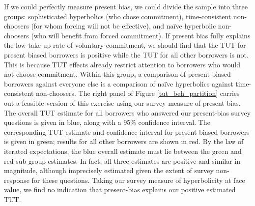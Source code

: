 \documentclass[oneside,11pt]{article}
\begin{document}
If we could perfectly measure present bias, we could divide the sample into three groups: sophisticated hyperbolics (who chose commitment), time-consistent non-choosers (for whom forcing will not be effective), and na\"{i}ve hyperbolic non-choosers (who will benefit from forced commitment). If present bias fully explains the low take-up rate of voluntary commitment, we should find that the TUT for present biased borrowers is positive while the TUT for all other borrowers is not.
This is because TUT effects already restrict attention to borrowers who would not choose commitment.
Within this group, a comparison of present-biased borrowers against everyone else is a comparison of na\"{i}ve hyperbolics against time-consistent non-choosers.
The right panel of Figure \ref{tut_beh_partition} carries out a feasible version of this exercise using our survey measure of present bias.
The overall TUT estimate for all borrowers who answered our present-bias survey questions is given in blue, along with a 95\% confidence interval.
The corresponding TUT estimate and confidence interval for present-biased borrowers is given in green; results for all other borrowers are shown in red.
By the law of iterated expectations, the blue overall estimate must lie between the green and red sub-group estimates.
In fact, all three estimates are positive and similar in magnitude, although imprecisely estimated given the extent of survey non-response for these questions.
Taking our survey measure of hyperbolicity at face value, we find no indication that present-bias explains our positive estimated TUT. 
\end{document}
